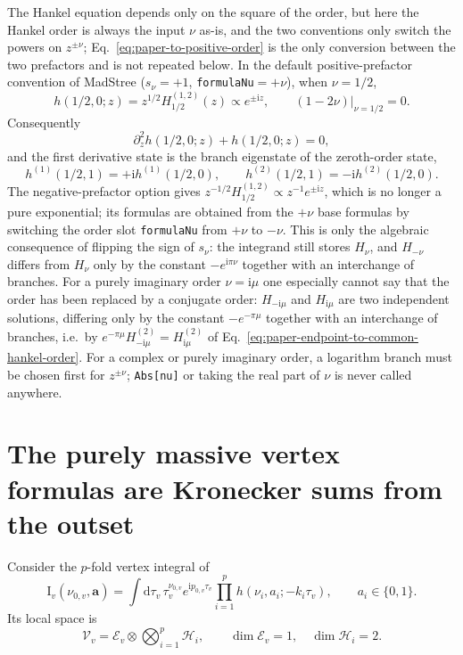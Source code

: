 \documentclass[11pt,a4paper]{article}
\newcommand{\dd}{\mathrm d}
\newcommand{\ii}{\mathrm i}
\newcommand{\cV}{\mathcal V}
\newcommand{\cE}{\mathcal E}
\newcommand{\cH}{\mathcal H}
\begin{document}
The Hankel equation depends only on the square of the order, but here the Hankel order is always the input $\nu$ as-is, and the two conventions only switch the powers on $z^{\pm\nu}$; Eq.~\eqref{eq:paper-to-positive-order} is the only conversion between the two prefactors and is not repeated below. In the default positive-prefactor convention of MadStree ($s_\nu=+1$, \texttt{formulaNu}$=+\nu$), when $\nu=1/2$,
\begin{equation}
 h(1/2,0;z)=z^{1/2}H_{1/2}^{(1,2)}(z)
 \propto e^{\pm\ii z},
 \qquad
 \left.(1-2\nu)\right|_{\nu=1/2}=0.
 \label{eq:massless-h-eigenstate}
\end{equation}
Consequently
\begin{equation}
 \partial_z^2h(1/2,0;z)+h(1/2,0;z)=0,
 \label{eq:massless-z-eom}
\end{equation}
and the first derivative state is the branch eigenstate of the zeroth-order state,
\begin{equation}
 h^{(1)}(1/2,1)=+\ii h^{(1)}(1/2,0),
 \qquad
 h^{(2)}(1/2,1)=-\ii h^{(2)}(1/2,0).
 \label{eq:h-branch-eigenvalues}
\end{equation}
The negative-prefactor option gives $z^{-1/2}H_{1/2}^{(1,2)}\propto z^{-1}e^{\pm\ii z}$, which is no longer a pure exponential; its formulas are obtained from the $+\nu$ base formulas by switching the order slot \texttt{formulaNu} from $+\nu$ to $-\nu$. This is only the algebraic consequence of flipping the sign of $s_\nu$: the integrand still stores $H_\nu$, and $H_{-\nu}$ differs from $H_\nu$ only by the constant $-e^{\ii\pi\nu}$ together with an interchange of branches. For a purely imaginary order $\nu=\ii\mu$ one especially cannot say that the order has been replaced by a conjugate order: $H_{-\ii\mu}$ and $H_{\ii\mu}$ are two independent solutions, differing only by the constant $-e^{-\pi\mu}$ together with an interchange of branches, i.e.\ by $e^{-\pi\mu}H^{(2)}_{-\ii\mu}=H^{(2)}_{\ii\mu}$ of Eq.~\eqref{eq:paper-endpoint-to-common-hankel-order}. For a complex or purely imaginary order, a logarithm branch must be chosen first for $z^{\pm\nu}$; \texttt{Abs[nu]} or taking the real part of $\nu$ is never called anywhere.

\section{The purely massive vertex formulas are Kronecker sums from the outset}

Consider the $p$-fold vertex integral of \cite{Chen:2023eic}
\begin{equation}
 \text{I}_v(\nu_{0,v},\bm a)
 =\int\dd\tau_v\,
 \tau_v^{\nu_{0,v}}e^{\ii p_{0,v}\tau_v}
 \prod_{i=1}^{p}h(\nu_i,a_i;-k_i\tau_v),
 \qquad a_i\in\{0,1\}.
\end{equation}
Its local space is
\begin{equation}
 \cV_v
 =\cE_v
 \otimes\bigotimes_{i=1}^{p}\cH_i,
 \qquad
 \dim\cE_v=1,
 \quad
 \dim\cH_i=2.
 \label{eq:vertex-tensor-space}
\end{equation}
\end{document}
